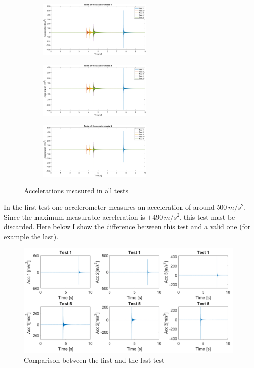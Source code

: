 \documentclass[11pt,a4paper]{article}
\begin{document}
\begin{enumerate}
	\begin{figure}[H]
		\centering
		\begin{subfigure}[b]{0.3\textwidth}
			\centering
			\includegraphics[width=55mm]{images/3_accelerations1.png}
		\end{subfigure}
		\hfill
		\begin{subfigure}[b]{0.3\textwidth}
			\centering
			\includegraphics[width=55mm]{images/3_accelerations2.png}
		\end{subfigure}
		\hfill
		\begin{subfigure}[b]{0.3\textwidth}
			\centering
			\includegraphics[width=55mm]{images/3_accelerations3.png}
		\end{subfigure}
		\caption{Accelerations measured in all tests}
	\end{figure}
	
	
	In the first test one accelerometer measures an acceleration of around $500\,m/s^2$. Since the maximum measurable acceleration is $\pm 490\,m/s^2$, this test must be discarded.
	Here below I show the difference between this test and a valid one (for example the last).  
	
	\begin{figure}[H]
		\centering
		\includegraphics[width=150mm]{images/3_comparison1e5.png}
		\caption{Comparison between the first and the last test}
	\end{figure}


\end{enumerate}
\end{document}
